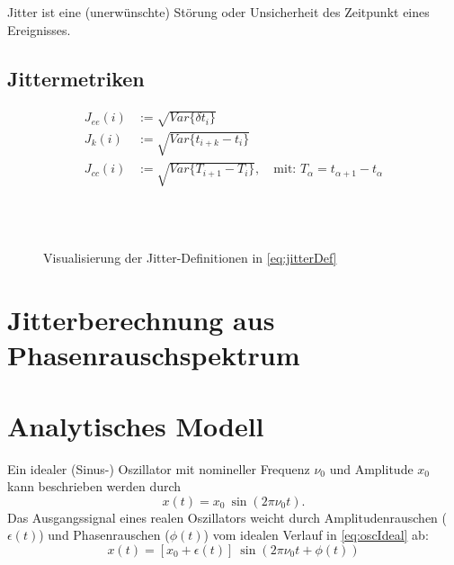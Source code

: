 \begin{definition}[Jitter]
	Jitter ist eine (unerwünschte) Störung oder Unsicherheit des Zeitpunkt eines Ereignisses. \cite{Kundert2012}
\end{definition}

\subsection{Jittermetriken}

\begin{subequations}
	\label{eq:jitterDef}
	\begin{align}
	J_{ee}(i)&:=\sqrt{Var\{\delta t_i\}} \\
	J_k(i)&:=\sqrt{Var\{t_{i+k}-t_i\}} \\
	J_{cc}(i)&:=\sqrt{Var\{T_{i+1}-T_i\}}, \quad \text{mit: } T_\alpha=t_{\alpha+1}-t_\alpha
	\end{align}
\end{subequations}

\begin{figure}[H]
	\centering
	\\[4ex]
	\\[4ex]
	\caption{Visualisierung der Jitter-Definitionen in \autoref{eq:jitterDef}}
\end{figure}



\section{Jitterberechnung aus Phasenrauschspektrum}

\section{Analytisches Modell}
Ein idealer (Sinus-) Oszillator mit nomineller Frequenz $\nu_0$ und Amplitude $x_0$ kann beschrieben werden durch
\begin{equation}
\label{eq:oscIdeal}
	x(t)=x_0 \: \sin(2\pi \nu_0 t).
\end{equation}
Das Ausgangssignal eines realen Oszillators weicht durch Amplitudenrauschen ($\epsilon(t)$) und Phasenrauschen ($\phi(t)$) vom idealen Verlauf in \autoref{eq:oscIdeal} ab:
\begin{equation}
	x(t)=[x_0 + \epsilon(t)] \: \sin(2\pi \nu_0 t + \phi(t))
\end{equation}

